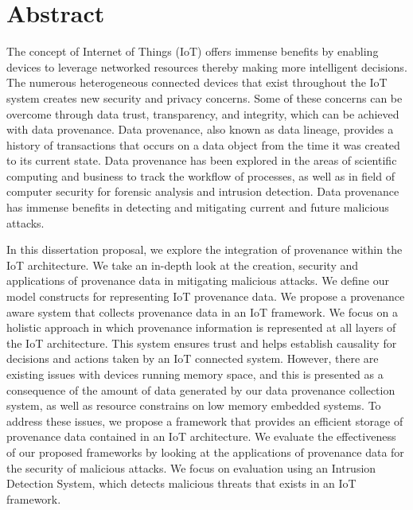 

\chapter*{Abstract}
The concept of Internet of Things (IoT) offers immense benefits by
enabling devices to leverage networked resources thereby making more intelligent
decisions. The numerous heterogeneous connected devices that exist throughout
the IoT system creates new security and privacy concerns. Some of these concerns can
be overcome through data trust, transparency, and integrity, which can be
achieved with data provenance. Data provenance, also known as data lineage, provides a history of transactions that occurs on a data object from the time it was created to its current state. Data provenance has been explored in the areas of scientific computing and business to track the workflow of processes, as well as in field of computer security for forensic analysis and intrusion detection. Data provenance has immense benefits in detecting and mitigating current and future malicious attacks.  \par In this dissertation proposal, we explore the integration of provenance within the IoT architecture. We take an in-depth look at the creation, security and applications of provenance data in mitigating malicious attacks. We define our model constructs for representing IoT provenance data. We propose a provenance aware system that collects provenance data in an IoT framework. We focus on a holistic approach in which provenance information is represented at all layers of the IoT architecture. This system ensures trust and helps establish causality for decisions and actions taken by an IoT connected system. However, there are existing issues with devices running memory space, and this is presented as a consequence of the amount of data generated by our data provenance collection system, as well as resource constrains on low memory embedded systems. To address these issues, we propose a framework that provides an efficient storage of provenance data contained in an IoT architecture. We evaluate the effectiveness of our proposed frameworks by looking at the applications of provenance data for the security of malicious attacks. We focus on evaluation using an Intrusion Detection System, which detects malicious threats that exists in an IoT framework.


